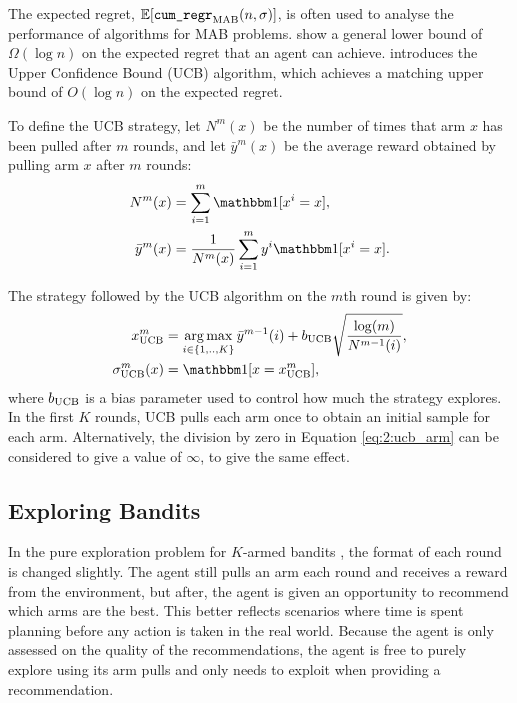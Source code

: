     The expected regret, $\mathbb{E}[{\textnormal{\texttt{cum\_regr}}}_{{\textnormal{MAB}}}(n,\sigma)]$, is often used to analyse the performance of algorithms for MAB problems. \citet{mab_lower_bound} show a general lower bound of $\Omega(\log n)$ on the expected regret that an agent can achieve. \citet{ucb} introduces the Upper Confidence Bound (UCB) algorithm, which achieves a matching upper bound of $O(\log n)$ on the expected regret. 

    To define the UCB strategy, let $N^m(x)$ be the number of times that arm $x$ has been pulled after $m$ rounds, and let $\bar{y}^m(x)$ be the average reward obtained by pulling arm $x$ after $m$ rounds:
    \begin{align}
        N^m(x) &= \sum_{i=1}^m \one[x^i = x], \label{eq:2:mab_num_arm_pulls_def} \\
        \bar{y}^m(x) &= \frac{1}{N^m(x)} \sum_{i=1}^m y^i \one[x^i = x]. \label{eq:2:mab_arm_sample_avg} 
    \end{align}

    The strategy followed by the UCB algorithm on the $m$th round is given by:
    \begin{align}
        x^m_{\ucb} &= \argmax_{i\in\{1,..,K\}} \bar{y}^{m-1}(i) + b_{\ucb} \sqrt{\frac{\log(m)}{N^{m-1}(i)}}, \label{eq:2:ucb_arm} \\
        \sigma^m_{\ucb}(x) &= \one[x=x^m_{\ucb}], \label{eq:2:ucb_strategy}
    \end{align}
    where $b_{{\textnormal{UCB}}}$ is a bias parameter used to control how much the strategy explores. In the first $K$ rounds, UCB pulls each arm once to obtain an initial sample for each arm. Alternatively, the division by zero in Equation \ref{eq:2:ucb_arm} can be considered to give a value of $\infty$, to give the same effect.
    





\subsection{Exploring Bandits}
\label{sec:2-1-2-exploring-mab}

    In the pure exploration problem for $K$-armed bandits \cite{exploring_bandit}, the format of each round is changed slightly. The agent still pulls an arm each round and receives a reward from the environment, but after, the agent is given an opportunity to recommend which arms are the best. This better reflects scenarios where time is spent planning before any action is taken in the real world. Because the agent is only assessed on the quality of the recommendations, the agent is free to purely explore using its arm pulls and only needs to exploit when providing a recommendation. 

